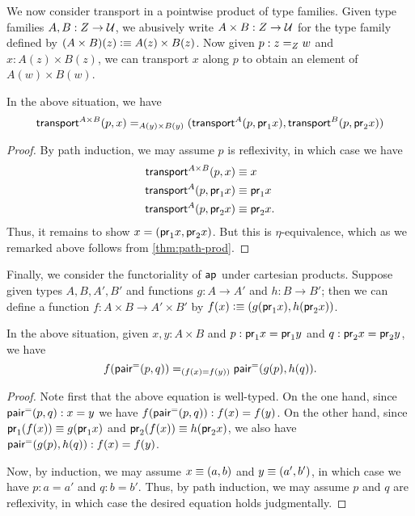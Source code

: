 We now consider transport in a pointwise product of type families.
Given type families $ A, B : Z \to \type$, we abusively write $A\times B:Z\to \type$ for the type family defined by $(A\times B)(z) \defeq A(z) \times B(z)$.
Now given $p : \id[Z]{z}{w}$ and $x : A(z) \times B(z)$, we can transport $x$ along $p$ to obtain an element of $A(w)\times B(w)$.

\begin{thm}\label{thm:trans-prod}
  In the above situation, we have
  \[
  \id[A(y) \times B(y)]
  {\transfib{A\times B}px}
  {(\transfib{A}{p}{\proj{1}x}, \transfib{B}{p}{\proj{2}x})}
  \]
\end{thm}
\begin{proof}
  By path induction, we may assume $p$ is reflexivity, in which case we have
  \begin{align*}
    \transfib{A\times B}px&\jdeq x\\
    \transfib{A}{p}{\proj{1}x}&\jdeq \proj1x\\
    \transfib{A}{p}{\proj{2}x}&\jdeq \proj2x.
  \end{align*}
  Thus, it remains to show $x = (\proj1 x, \proj2x)$.
  But this is $\eta$-equivalence, which as we remarked above follows from \autoref{thm:path-prod}.
\end{proof}

Finally, we consider the functoriality of $\apfunc{}$ under cartesian products.
Suppose given types $A,B,A',B'$ and functions $g:A\to A'$ and $h:B\to B'$; then we can define a function $f:A\times B\to A'\times B'$ by $f(x) \defeq (g(\proj1x),h(\proj2x))$.

\begin{thm}\label{thm:ap-prod}
  In the above situation, given $x,y:A\times B$ and $p:\proj1x=\proj1y$ and $q:\proj2x=\proj2y$, we have
  \[ \id[(f(x)=f(y))]{\ap{f}{\pairpath(p,q)}} {\pairpath(\ap{g}{p},\ap{h}{q})}. \]
\end{thm}
\begin{proof}
  Note first that the above equation is well-typed.
  On the one hand, since $\pairpath(p,q):x=y$ we have $\ap{f}{\pairpath(p,q)}:f(x)=f(y)$.
  On the other hand, since $\proj1(f(x))\jdeq g(\proj1x)$ and $\proj2(f(x))\jdeq h(\proj2x)$, we also have $\pairpath(\ap{g}{p},\ap{h}{q}):f(x)=f(y)$.

  Now, by induction, we may assume $x\jdeq(a,b)$ and $y\jdeq(a',b')$, in which case we have $p:a=a'$ and $q:b=b'$.
  Thus, by path induction, we may assume $p$ and $q$ are reflexivity, in which case the desired equation holds judgmentally.
\end{proof}


